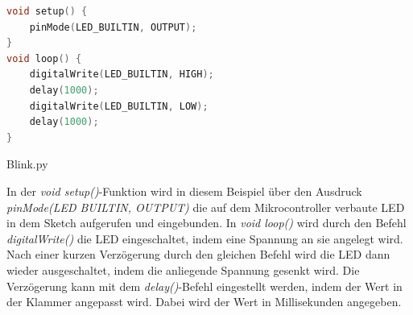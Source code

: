 \begin{code}[H]
	\begin{lstlisting}[language=c++]
void setup() {
	pinMode(LED_BUILTIN, OUTPUT);
}
void loop() {
	digitalWrite(LED_BUILTIN, HIGH);
	delay(1000);                     
	digitalWrite(LED_BUILTIN, LOW);  
	delay(1000);                     
}
\end{lstlisting}      

\caption[Blink.py]{Blink.py}\label{Code:Blink}    
\end{code} 

In der \textit{void setup()}-Funktion wird in diesem Beispiel über den Ausdruck \textit{pinMode(LED BUILTIN, OUTPUT)} die auf dem Mikrocontroller verbaute LED in dem Sketch aufgerufen und eingebunden.
In \textit{void loop()} wird durch den Befehl\textit{ digitalWrite()} die LED eingeschaltet, indem eine Spannung an sie angelegt wird. Nach einer kurzen Verzögerung durch den gleichen Befehl wird die LED dann wieder ausgeschaltet, indem die anliegende Spannung gesenkt wird. Die Verzögerung kann mit dem \textit{delay()}-Befehl eingestellt werden, indem der Wert in der Klammer angepasst wird. Dabei wird der Wert in Millisekunden angegeben.\cite{Arduino.2014}
